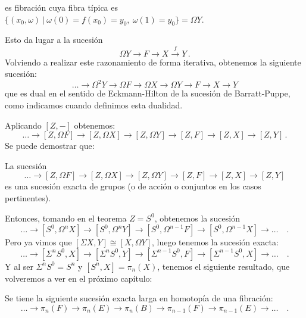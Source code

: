 es fibración cuya fibra típica es $\{(x_0, \omega) \ \vert \ \omega(0) = f(x_0) = y_0, \ \omega(1) = y_0 \} = \Omega Y$. \par
Esto da lugar a la sucesión
\[ \Omega Y \longrightarrow F \longrightarrow X \stackrel{f}{\longrightarrow} Y \, . \]
Volviendo a realizar este razonamiento de forma iterativa, obtenemos la siguiente sucesión:
\[ \dots \longrightarrow \Omega^2 Y \longrightarrow \Omega F \longrightarrow \Omega X \longrightarrow \Omega Y \longrightarrow F \longrightarrow X \longrightarrow Y \]
que es dual en el sentido de Eckmann-Hilton de la sucesión de Barratt-Puppe, como indicamos cuando definimos esta dualidad. \par Aplicando $[Z,-]$ obtenemos: 
\[ \dots  \longrightarrow [Z,\Omega F] \longrightarrow [Z, \Omega X] \longrightarrow [Z,\Omega Y] \longrightarrow [Z, F] \longrightarrow [Z, X] \longrightarrow [Z, Y] \, . \]
Se puede demostrar que:
\begin{teorf}
La sucesión
\[ \dots  \longrightarrow [Z,\Omega F] \longrightarrow [Z, \Omega X] \longrightarrow [Z,\Omega Y] \longrightarrow [Z, F] \longrightarrow [Z, X] \longrightarrow [Z, Y] \]
es una sucesión exacta de grupos (o de acción o conjuntos en los casos pertinentes).
\end{teorf}
Entonces, tomando en el teorema $Z = S^0$, obtenemos la sucesión
\[ \dots \longrightarrow [S^0, \Omega^n X] \longrightarrow [S^0,\Omega^n Y] \longrightarrow [S^0, \Omega^{n-1} F] \longrightarrow [S^0, \Omega^{n-1} X] \longrightarrow \dots \quad . \]
Pero ya vimos que $[\Sigma X, Y] \cong [X, \Omega Y]$, luego tenemos la sucesión exacta:
\[ \dots  \longrightarrow [\Sigma^n S^0,  X] \longrightarrow [\Sigma^n S^0, Y] \longrightarrow [\Sigma^{n-1} S^0, F] \longrightarrow [\Sigma^{n-1}S^0,  X] \longrightarrow \dots \quad . \]
Y al ser $\Sigma^n S^0 = S^n$ y $[S^n, X] = \pi_n(X)$, tenemos el siguiente resultado, que volveremos a ver en el próximo capítulo:
\begin{teorf}
Se tiene la siguiente sucesión exacta larga en homotopía de una fibración:
\[
\dots \longrightarrow \pi_n (F) \longrightarrow \pi_n (E) \longrightarrow \pi_n (B) \longrightarrow \pi_{n-1} (F) \longrightarrow \pi_{n-1} (E) \longrightarrow \dots \quad .
\]
\end{teorf}